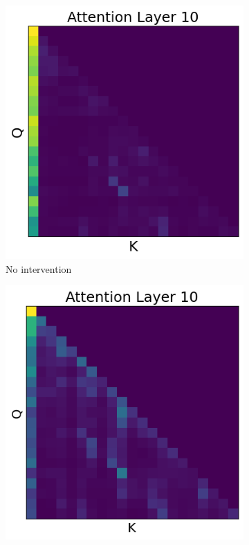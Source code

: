 \documentclass[11pt]{article}
\begin{document}
\begin{figure}[t!]
  \centering
  \begin{subfigure}[t]{0.22\textwidth}
    \centering
    \includegraphics[width=0.85\columnwidth]{figures/obs4_no_intervention.png}
    \caption{No intervention}
    \label{fig:no_intervention}
  \end{subfigure}
  \begin{subfigure}[t]{0.22\textwidth}
    \centering
    \includegraphics[width=0.85\columnwidth]{figures/obs4_intervention1.png}

\end{subfigure}
\end{figure}
\end{document}
